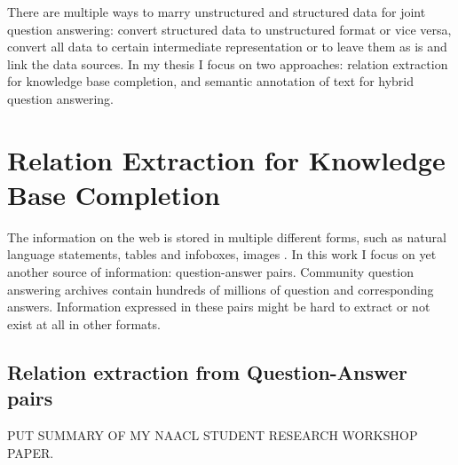 %

\label{chapter:factoid}

\noindent

There are multiple ways to marry unstructured and structured data for joint question answering: convert structured data to unstructured format or vice versa, convert all data to certain intermediate representation or to leave them as is and link the data sources.
In my thesis I focus on two approaches: relation extraction for knowledge base completion, and semantic annotation of text for hybrid question answering.

\section{Relation Extraction for Knowledge Base Completion}
\label{sec:relation_extraction}

The information on the web is stored in multiple different forms, such as natural language statements, tables and infoboxes, images \etc.
In this work I focus on yet another source of information: question-answer pairs.
Community question answering archives contain hundreds of millions of question and corresponding answers.
Information expressed in these pairs might be hard to extract or not exist at all in other formats.

\subsection{Relation extraction from Question-Answer pairs}
\label{subsec:cqa_relextract}

PUT SUMMARY OF MY NAACL STUDENT RESEARCH WORKSHOP PAPER.



